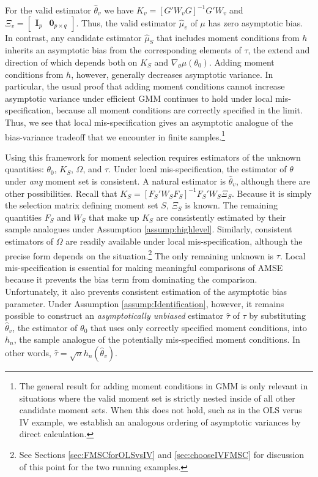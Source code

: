 For the valid estimator $\widehat{\theta}_v$ we have $K_v = \left[G'W_{v}G\right]^{-1}G' W_{v}$ and $\Xi_v =\left[\begin{array}{cc} \mathbf{I}_p& \mathbf{0}_{p\times q} \end{array} \right]$. 
Thus, the valid estimator $\widehat{\mu}_v$ of $\mu$ has zero asymptotic bias. 
In contrast, any candidate estimator $\widehat{\mu}_S$ that includes moment conditions from $h$ inherits an asymptotic bias from the corresponding elements of $\tau$, the extend and direction of which depends both on $K_S$ and $\nabla_\theta\mu(\theta_0)$. 
Adding moment conditions from $h$, however, generally decreases asymptotic variance. 
In particular, the usual proof that adding moment conditions cannot increase asymptotic variance under efficient GMM \citep[see for example][ch.\ 6]{Hallbook} continues to hold under local mis-specification, because all moment conditions are correctly specified in the limit. 
Thus, we see that local mis-specification gives an asymptotic analogue of the bias-variance tradeoff that we encounter in finite samples.\footnote{The general result for adding moment conditions in GMM is only relevant in situations where the valid moment set is strictly nested inside of all other candidate moment sets. When this does not hold, such as in the OLS verus IV example, we establish an analogous ordering of asymptotic variances by direct calculation.} 

Using this framework for moment selection requires estimators of the unknown quantities: $\theta_0$, $K_S$, $\Omega$, and $\tau$. 
Under local mis-specification, the estimator of $\theta$ under \emph{any} moment set is consistent. 
A natural estimator is $\widehat{\theta}_v$, although there are other possibilities. 
Recall that $K_S = [F_S'W_SF_S]^{-1} F_S'W_S \Xi_S$.
Because it is simply the selection matrix defining moment set $S$, $\Xi_S$ is known.  
The remaining quantities $F_S$ and $W_S$ that make up $K_S$ are consistently estimated by their sample analogues under Assumption \ref{assump:highlevel}.
Similarly, consistent estimators of $\Omega$ are readily available under local mis-specification, although the precise form depends on the situation.\footnote{See Sections \ref{sec:FMSCforOLSvsIV} and \ref{sec:chooseIVFMSC} for discussion of this point for the two running examples.}
The only remaining unknown is $\tau$. Local mis-specification is essential for making meaningful comparisons of AMSE because it prevents the bias term from dominating the comparison. 
Unfortunately, it also prevents consistent estimation of the asymptotic bias parameter.
Under Assumption \ref{assump:Identification}, however, it remains possible to construct an \emph{asymptotically unbiased} estimator $\widehat{\tau}$ of $\tau$ by substituting $\widehat{\theta}_v$, the estimator of $\theta_0$ that uses only correctly specified moment conditions, into $h_n$, the sample analogue of the potentially mis-specified moment conditions. 
In other words,  $\widehat{\tau} = \sqrt{n} h_n(\widehat{\theta}_v)$. 

